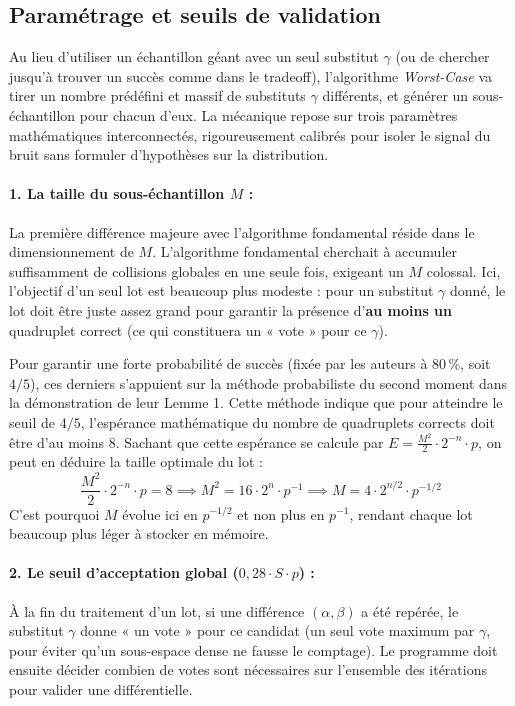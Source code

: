 \documentclass[a4paper,11pt]{article}
\begin{document}
\subsection{Paramétrage et seuils de validation}

Au lieu d'utiliser un échantillon géant avec un seul substitut $\gamma$ (ou de chercher jusqu'à trouver un succès comme dans le tradeoff), l'algorithme \textit{Worst-Case} va tirer un nombre prédéfini et massif de substituts $\gamma$ différents, et générer un sous-échantillon pour chacun d'eux. La mécanique repose sur trois paramètres mathématiques interconnectés, rigoureusement calibrés pour isoler le signal du bruit sans formuler d'hypothèses sur la distribution.

\paragraph{1. La taille du sous-échantillon $M$ :}
La première différence majeure avec l'algorithme fondamental réside dans le dimensionnement de $M$. L'algorithme fondamental cherchait à accumuler suffisamment de collisions globales en une seule fois, exigeant un $M$ colossal. Ici, l'objectif d'un seul lot est beaucoup plus modeste : pour un substitut $\gamma$ donné, le lot doit être juste assez grand pour garantir la présence d'\textbf{au moins un} quadruplet correct (ce qui constituera un « vote » pour ce $\gamma$).

Pour garantir une forte probabilité de succès (fixée par les auteurs à $80\,\%$, soit $4/5$), ces derniers s'appuient sur la méthode probabiliste du second moment dans la démonstration de leur Lemme 1. Cette méthode indique que pour atteindre le seuil de $4/5$, l'espérance mathématique du nombre de quadruplets corrects doit être d'au moins $8$. Sachant que cette espérance se calcule par $E = \frac{M^2}{2} \cdot 2^{-n} \cdot p$, on peut en déduire la taille optimale du lot :
\begin{equation*}
    \frac{M^2}{2} \cdot 2^{-n} \cdot p = 8 \implies M^2 = 16 \cdot 2^n \cdot p^{-1} \implies M = 4 \cdot 2^{n/2} \cdot p^{-1/2}
\end{equation*}
C'est pourquoi $M$ évolue ici en $p^{-1/2}$ et non plus en $p^{-1}$, rendant chaque lot beaucoup plus léger à stocker en mémoire.

\paragraph{2. Le seuil d'acceptation global ($0,28 \cdot S \cdot p$) :}
À la fin du traitement d'un lot, si une différence $(\alpha, \beta)$ a été repérée, le substitut $\gamma$ donne « un vote » pour ce candidat (un seul vote maximum par $\gamma$, pour éviter qu'un sous-espace dense ne fausse le comptage). Le programme doit ensuite décider combien de votes sont nécessaires sur l'ensemble des itérations pour valider une différentielle. 
\end{document}
